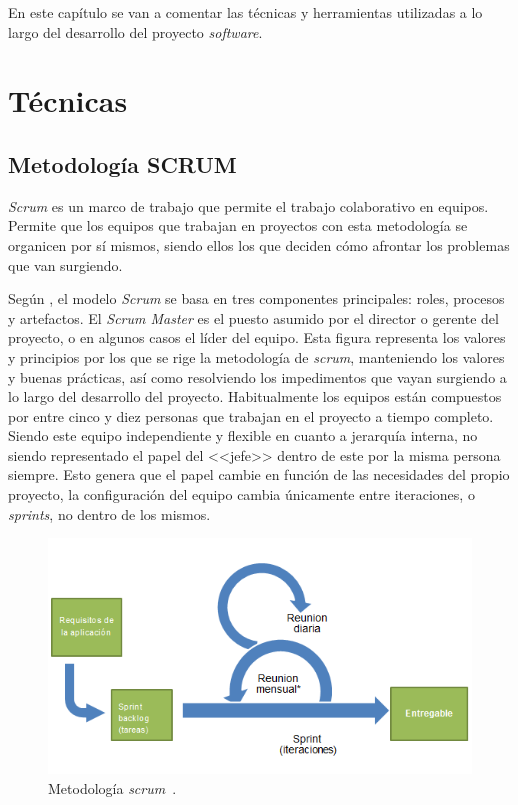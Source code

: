 
En este capítulo se van a comentar las técnicas y herramientas utilizadas a lo largo del desarrollo del proyecto \textit{software}.

\section{Técnicas}\label{sec:tecnicas}

\subsection{Metodología SCRUM}
\textit{Scrum} es un marco de trabajo que permite el trabajo colaborativo en equipos. Permite que los equipos que trabajan en proyectos con esta metodología se organicen por sí mismos, siendo ellos los que deciden cómo afrontar los problemas que van surgiendo. 

Según \cite{cervone2011understanding}, el modelo \textit{Scrum} se basa en tres componentes principales: roles, procesos y artefactos. El \textit{Scrum Master} es el puesto asumido por el director o gerente del proyecto, o en algunos casos el líder del equipo. Esta figura representa los valores y principios por los que se rige la metodología de \textit{scrum}, manteniendo los valores y buenas prácticas, así como resolviendo los impedimentos que vayan surgiendo a lo largo del desarrollo del proyecto. Habitualmente los equipos están compuestos por entre cinco y diez personas que trabajan en el proyecto a tiempo completo. Siendo este equipo independiente y flexible en cuanto a jerarquía interna, no siendo representado el papel del <<jefe>> dentro de este por la misma persona siempre. Esto genera que el papel cambie en función de las necesidades del propio proyecto, la configuración del equipo cambia únicamente entre iteraciones, o \textit{sprints}, no dentro de los mismos.

\begin{figure}[]
	\centering
	\includegraphics[scale=0.5]{../img/anexos/scrum-overview-es}
	\caption{Metodología \textit{scrum}~\cite{SCRUMWIKI}.}\label{img:scrum-overview}
\end{figure}

